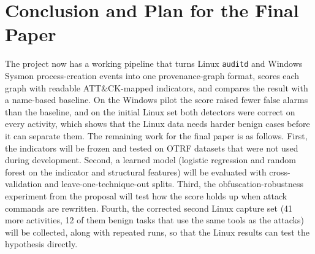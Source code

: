 \documentclass[conference]{IEEEtran}
\begin{document}
\section{Conclusion and Plan for the Final Paper}
The project now has a working pipeline that turns Linux \texttt{auditd} and
Windows Sysmon process-creation events into one provenance-graph format,
scores each graph with readable ATT\&CK-mapped indicators, and compares the
result with a name-based baseline. On the Windows pilot the score raised
fewer false alarms than the baseline, and on the initial Linux set both
detectors were correct on every activity, which shows that the Linux data
needs harder benign cases before it can separate them. The remaining work
for the final paper is as follows. First, the indicators will be frozen and
tested on OTRF datasets that were not used during development. Second, a
learned model (logistic regression and random forest on the indicator and
structural features) will be evaluated with cross-validation and
leave-one-technique-out splits. Third, the obfuscation-robustness experiment
from the proposal will test how the score holds up when attack commands are
rewritten. Fourth, the corrected second Linux capture set (41 more
activities, 12 of them benign tasks that use the same tools as the attacks)
will be collected, along with repeated runs, so that the Linux results can
test the hypothesis directly.



\end{document}
